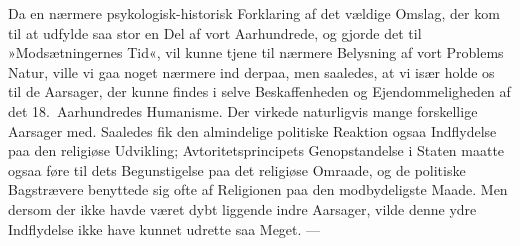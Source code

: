 \documentclass[12pt,a4paper]{article}
\newcommand{\apage}[1]{\marginnote{\footnotesize\textit{[#1]}}}
\begin{document}
Da en nærmere psykologisk-historisk Forklaring af det vældige \apage{203} Omslag, der kom
til at udfylde saa stor en Del af vort Aarhundrede, og gjorde det til
»Modsætningernes Tid«, vil kunne tjene til nærmere Belysning af vort Problems
Natur, ville vi gaa noget nærmere ind derpaa, men saaledes, at vi især holde
os til de Aarsager, der kunne findes i selve Beskaffenheden og Ejendommeligheden
af det 18.\ Aarhundredes Humanisme. Der virkede naturligvis mange forskellige
Aarsager med. Saaledes fik den almindelige politiske Reaktion ogsaa Indflydelse
paa den religiøse Udvikling; Avtoritetsprincipets Genopstandelse i Staten maatte
ogsaa føre til dets Begunstigelse paa det religiøse Omraade, og de politiske
Bagstrævere benyttede sig ofte af Religionen paa den modbydeligste Maade. Men
dersom der ikke havde været dybt liggende indre Aarsager, vilde denne ydre
Indflydelse ikke have kunnet udrette saa Meget. ---
\end{document}
